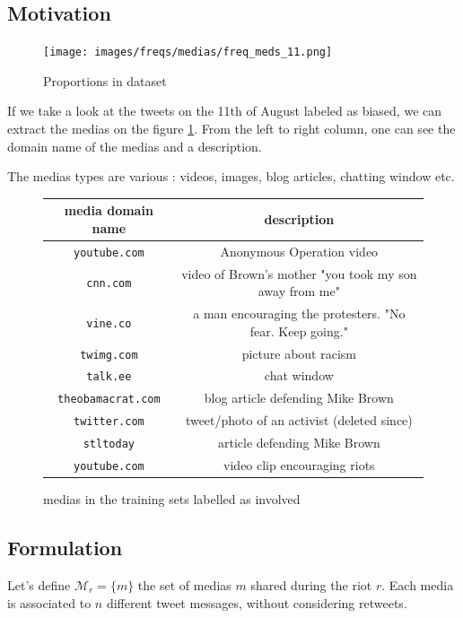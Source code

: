 \documentclass[a4paper,12pt]{report}
\begin{document}
\subsection{Motivation}

\begin{figure}[H]
\centering
\texttt{[image: images/freqs/medias/freq\_meds\_11.png]}
\caption{Proportions in dataset}
\end{figure}

If we take a look at the tweets on the 11th of August labeled as biased, we can extract the medias on the figure \ref{tweets500mediasBiaised}. From the left to right column, one can see the domain name of the medias and a description.

The medias types are various : videos, images, blog articles, chatting window etc.
\begin{figure}[H]
  \centering
\begin{tabular}{|c|c|}
\hline
media domain name & description \\ \hline
\texttt{youtube.com} & Anonymous Operation video \\ \hline
\texttt{cnn.com} & video of Brown's mother "you took my son away from me" \\
\texttt{vine.co} & a man encouraging the protesters. "No fear. Keep going." \\ \hline
\texttt{twimg.com} & picture about racism \\ \hline
\texttt{talk.ee} & chat window \\ \hline
\texttt{theobamacrat.com} & blog article defending Mike Brown \\ \hline
\texttt{twitter.com} & tweet/photo of an activist (deleted since) \\ \hline
\texttt{stltoday} & article defending Mike Brown \\ \hline
\texttt{youtube.com} & video clip encouraging riots \\ \hline
\hline
\end{tabular}
\label{tweets500mediasBiaised}
\caption{medias in the training sets labelled as involved}
\end{figure}

\newpage

\subsection{Formulation}
Let's define $ \mathcal{M}_r = \{ m \} $ the set of medias $m$ shared during the riot $r$. Each media is associated to $n$ different tweet messages, without considering retweets.
\end{document}
